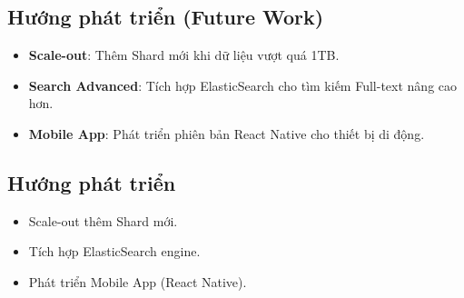 \documentclass[a4paper,12pt]{article}
\begin{document}
\subsection{Hướng phát triển (Future Work)}
\begin{itemize}
    \item \textbf{Scale-out}: Thêm Shard mới khi dữ liệu vượt quá 1TB.
    \item \textbf{Search Advanced}: Tích hợp ElasticSearch cho tìm kiếm Full-text nâng cao hơn.
    \item \textbf{Mobile App}: Phát triển phiên bản React Native cho thiết bị di động.
\end{itemize}

\subsection{Hướng phát triển}
\begin{itemize}
    \item Scale-out thêm Shard mới.
    \item Tích hợp ElasticSearch engine.
    \item Phát triển Mobile App (React Native).
\end{itemize}
\end{document}
